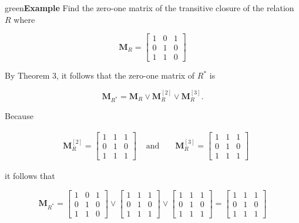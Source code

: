 \documentclass[11pt]{article}
\newenvironment{example}[1][\unskip]{\begin{mybox}{green}{\textbf{Example} {#1}}}{\end{mybox}}
\begin{document}
\newpage
\begin{example}
Find the zero-one matrix of the transitive closure of the relation $R$ where

\begin{equation*}
\textbf{M}_R = 
    \begin{bmatrix}
    1 & 0 & 1\\
    0 & 1 & 0\\
    1 & 1 & 0
    \end{bmatrix}
\end{equation*}

By Theorem 3, it follows that the zero-one matrix of $R^*$ is

\begin{equation*}
    \textbf{M}_{R^*} = \textbf{M}_{R} \lor \textbf{M}_{R}^{[2]} \lor \textbf{M}_{R}^{[3]}.
\end{equation*}

Because

\begin{align*}
    &\textbf{M}_R^{[2]} = 
    \begin{bmatrix}
    1 & 1 & 1\\
    0 & 1 & 0\\
    1 & 1 & 1
    \end{bmatrix}
    & \text{ and } &
    & \textbf{M}_R^{[3]} = 
    \begin{bmatrix}
    1 & 1 & 1\\
    0 & 1 & 0\\
    1 & 1 & 1
    \end{bmatrix}
\end{align*}

it follows that

\begin{equation*}
    \textbf{M}_{R^*} = 
    \begin{bmatrix}
    1 & 0 & 1\\
    0 & 1 & 0\\
    1 & 1 & 0
    \end{bmatrix} \lor
    \begin{bmatrix}
    1 & 1 & 1\\
    0 & 1 & 0\\
    1 & 1 & 1
    \end{bmatrix} \lor
    \begin{bmatrix}
    1 & 1 & 1\\
    0 & 1 & 0\\
    1 & 1 & 1
    \end{bmatrix} =
    \begin{bmatrix}
    1 & 1 & 1\\
    0 & 1 & 0\\
    1 & 1 & 1
    \end{bmatrix}
\end{equation*}
\end{example}
\end{document}
